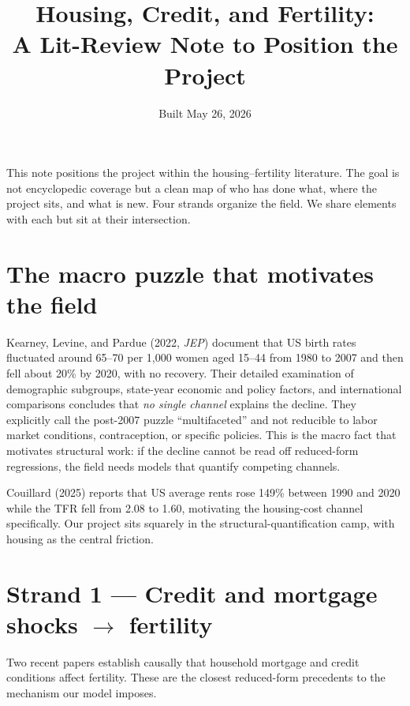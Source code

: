 \documentclass[11pt]{article}
\title{Housing, Credit, and Fertility:\\ A Lit-Review Note to Position the Project}
\author{}
\date{Built May 26, 2026}
\begin{document}
\maketitle

\noindent This note positions the project within the housing--fertility literature. The goal is not encyclopedic coverage but a clean map of who has done what, where the project sits, and what is new. Four strands organize the field. We share elements with each but sit at their intersection.

\section{The macro puzzle that motivates the field}

Kearney, Levine, and Pardue (2022, \emph{JEP}) document that US birth rates fluctuated around 65--70 per 1{,}000 women aged 15--44 from 1980 to 2007 and then fell about 20\% by 2020, with no recovery. Their detailed examination of demographic subgroups, state-year economic and policy factors, and international comparisons concludes that \emph{no single channel} explains the decline. They explicitly call the post-2007 puzzle ``multifaceted'' and not reducible to labor market conditions, contraception, or specific policies. This is the macro fact that motivates structural work: if the decline cannot be read off reduced-form regressions, the field needs models that quantify competing channels.

Couillard (2025) reports that US average rents rose 149\% between 1990 and 2020 while the TFR fell from 2.08 to 1.60, motivating the housing-cost channel specifically. Our project sits squarely in the structural-quantification camp, with housing as the central friction.

\section{Strand 1 --- Credit and mortgage shocks $\to$ fertility}

Two recent papers establish causally that household mortgage and credit conditions affect fertility. These are the closest reduced-form precedents to the mechanism our model imposes.
\end{document}
